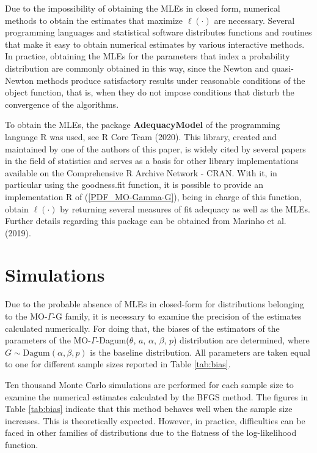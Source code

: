 \documentclass[12pt,a4paper]{article} %
\begin{document}
Due to the impossibility of obtaining the MLEs in closed form, numerical methods to obtain the estimates that maximize $ \ell (\cdot) $ are necessary. Several programming languages and statistical software distributes functions and routines that make it easy to obtain numerical estimates by various interactive methods. In practice, obtaining the MLEs for the parameters that index a probability distribution are commonly obtained in this way, since the Newton and quasi-Newton methods produce satisfactory results under reasonable conditions of the object function, that is, when they do not impose conditions that disturb the convergence of the algorithms.

To obtain the MLEs, the package {\bf AdequacyModel} of the programming language {\sf R} was used, see R Core Team (2020). This library, created and maintained by one of the authors of this paper, is widely cited by several papers in the field of statistics and serves as a basis for other library implementations available on the Comprehensive R Archive Network - CRAN.  With it, in particular using the goodness.fit function, it is possible to provide an implementation {\sf R} of (\ref {PDF_MO-Gamma-G}), being in charge of this function, obtain $\ell(\cdot)$  by returning several measures of fit adequacy as well as the MLEs. Further details regarding this package can be obtained from Marinho et al. (2019).


\section{Simulations}\label{sec:simulation}

Due to the probable absence of MLEs in closed-form for distributions belonging to the MO-$\Gamma $-G family, it is necessary to examine the
precision of the estimates calculated numerically. For doing that, the biases of the estimators of the parameters of the
MO-$\Gamma$-Dagum($\theta$, $a$, $\alpha$, $\beta$, $p$) distribution are determined, where $G\sim \mathrm {Dagum} (\alpha, \beta, p)$
is the baseline distribution. All parameters are taken equal to one for different sample sizes reported in Table \ref{tab:bias}.

Ten thousand Monte Carlo simulations are performed for each sample size to examine the numerical estimates calculated by the
BFGS method. The figures in Table \ref{tab:bias} indicate that this method behaves well when the sample size increases.
This is theoretically expected. However, in practice, difficulties can be faced in other families of distributions
due to the flatness of the log-likelihood function.
\end{document}
